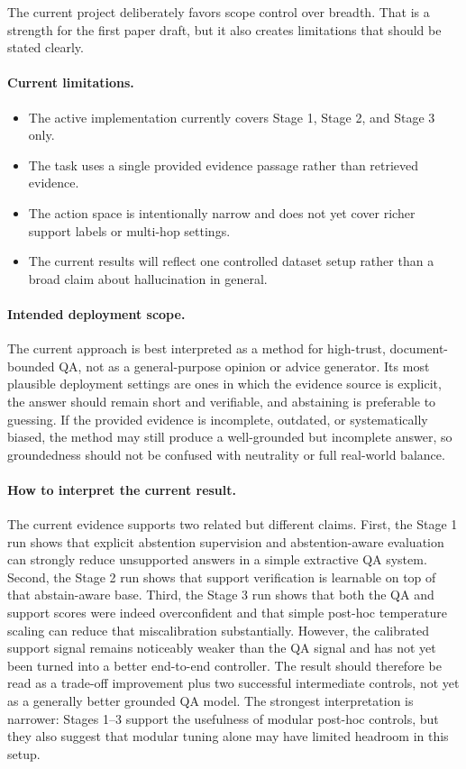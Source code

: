 The current project deliberately favors scope control over breadth.
That is a strength for the first paper draft, but it also creates limitations
that should be stated clearly.

\paragraph{Current limitations.}
\begin{itemize}[leftmargin=1.25em]
  \item The active implementation currently covers Stage 1, Stage 2, and
  Stage 3 only.
  \item The task uses a single provided evidence passage rather than retrieved
  evidence.
  \item The action space is intentionally narrow and does not yet cover richer
  support labels or multi-hop settings.
  \item The current results will reflect one controlled dataset setup rather
  than a broad claim about hallucination in general.
\end{itemize}

\paragraph{Intended deployment scope.}
The current approach is best interpreted as a method for high-trust,
document-bounded QA, not as a general-purpose opinion or advice generator.
Its most plausible deployment settings are ones in which the evidence source is
explicit, the answer should remain short and verifiable, and abstaining is
preferable to guessing.
If the provided evidence is incomplete, outdated, or systematically biased, the
method may still produce a well-grounded but incomplete answer, so groundedness
should not be confused with neutrality or full real-world balance.

\paragraph{How to interpret the current result.}
The current evidence supports two related but different claims.
First, the Stage 1 run shows that explicit abstention supervision and
abstention-aware evaluation can strongly reduce unsupported answers in a simple
extractive QA system.
Second, the Stage 2 run shows that support verification is learnable on top of
that abstain-aware base.
Third, the Stage 3 run shows that both the QA and support scores were indeed
overconfident and that simple post-hoc temperature scaling can reduce that
miscalibration substantially.
However, the calibrated support signal remains noticeably weaker than the QA
signal and has not yet been turned into a better end-to-end controller.
The result should therefore be read as a trade-off improvement plus two
successful intermediate controls, not yet as a generally better grounded QA
model.
The strongest interpretation is narrower:
Stages 1--3 support the usefulness of modular post-hoc controls, but they also
suggest that modular tuning alone may have limited headroom in this setup.

